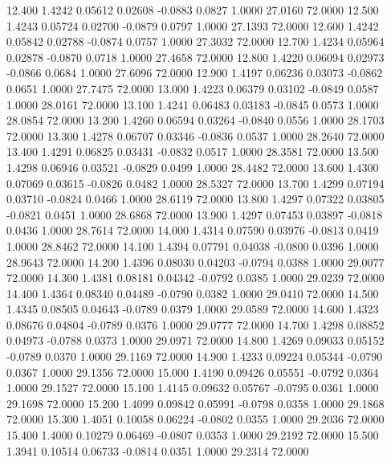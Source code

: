   12.400   1.4242   0.05612   0.02608  -0.0883   0.0827   1.0000  27.0160  72.0000
  12.500   1.4243   0.05724   0.02700  -0.0879   0.0797   1.0000  27.1393  72.0000
  12.600   1.4242   0.05842   0.02788  -0.0874   0.0757   1.0000  27.3032  72.0000
  12.700   1.4234   0.05964   0.02878  -0.0870   0.0718   1.0000  27.4658  72.0000
  12.800   1.4220   0.06094   0.02973  -0.0866   0.0684   1.0000  27.6096  72.0000
  12.900   1.4197   0.06236   0.03073  -0.0862   0.0651   1.0000  27.7475  72.0000
  13.000   1.4223   0.06379   0.03102  -0.0849   0.0587   1.0000  28.0161  72.0000
  13.100   1.4241   0.06483   0.03183  -0.0845   0.0573   1.0000  28.0854  72.0000
  13.200   1.4260   0.06594   0.03264  -0.0840   0.0556   1.0000  28.1703  72.0000
  13.300   1.4278   0.06707   0.03346  -0.0836   0.0537   1.0000  28.2640  72.0000
  13.400   1.4291   0.06825   0.03431  -0.0832   0.0517   1.0000  28.3581  72.0000
  13.500   1.4298   0.06946   0.03521  -0.0829   0.0499   1.0000  28.4482  72.0000
  13.600   1.4300   0.07069   0.03615  -0.0826   0.0482   1.0000  28.5327  72.0000
  13.700   1.4299   0.07194   0.03710  -0.0824   0.0466   1.0000  28.6119  72.0000
  13.800   1.4297   0.07322   0.03805  -0.0821   0.0451   1.0000  28.6868  72.0000
  13.900   1.4297   0.07453   0.03897  -0.0818   0.0436   1.0000  28.7614  72.0000
  14.000   1.4314   0.07590   0.03976  -0.0813   0.0419   1.0000  28.8462  72.0000
  14.100   1.4394   0.07791   0.04038  -0.0800   0.0396   1.0000  28.9643  72.0000
  14.200   1.4396   0.08030   0.04203  -0.0794   0.0388   1.0000  29.0077  72.0000
  14.300   1.4381   0.08181   0.04342  -0.0792   0.0385   1.0000  29.0239  72.0000
  14.400   1.4364   0.08340   0.04489  -0.0790   0.0382   1.0000  29.0410  72.0000
  14.500   1.4345   0.08505   0.04643  -0.0789   0.0379   1.0000  29.0589  72.0000
  14.600   1.4323   0.08676   0.04804  -0.0789   0.0376   1.0000  29.0777  72.0000
  14.700   1.4298   0.08852   0.04973  -0.0788   0.0373   1.0000  29.0971  72.0000
  14.800   1.4269   0.09033   0.05152  -0.0789   0.0370   1.0000  29.1169  72.0000
  14.900   1.4233   0.09224   0.05344  -0.0790   0.0367   1.0000  29.1356  72.0000
  15.000   1.4190   0.09426   0.05551  -0.0792   0.0364   1.0000  29.1527  72.0000
  15.100   1.4145   0.09632   0.05767  -0.0795   0.0361   1.0000  29.1698  72.0000
  15.200   1.4099   0.09842   0.05991  -0.0798   0.0358   1.0000  29.1868  72.0000
  15.300   1.4051   0.10058   0.06224  -0.0802   0.0355   1.0000  29.2036  72.0000
  15.400   1.4000   0.10279   0.06469  -0.0807   0.0353   1.0000  29.2192  72.0000
  15.500   1.3941   0.10514   0.06733  -0.0814   0.0351   1.0000  29.2314  72.0000
